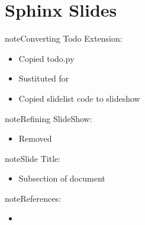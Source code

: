 \documentclass[letterpaper,12pt,english,openany,oneside]{sphinxmanual}
\begin{document}
\sphinxstepscope


\chapter{Sphinx Slides}
\label{\detokenize{slides/index:sphinx-slides}}\label{\detokenize{slides/index::doc}}
\begin{sphinxadmonition}{note}{\label{\detokenize{slides/index:id1}}Converting Todo Extension:}\begin{itemize}
\item {} 
\sphinxAtStartPar
Copied todo.py

\item {} 
\sphinxAtStartPar
Sustituted  for 

\item {} 
\sphinxAtStartPar
Copied slidelist code to slideshow

\end{itemize}
\end{sphinxadmonition}

\begin{sphinxadmonition}{note}{\label{\detokenize{slides/index:id2}}Refining SlideShow:}\begin{itemize}
\item {} 
\sphinxAtStartPar
Removed 

\end{itemize}
\end{sphinxadmonition}

\begin{sphinxadmonition}{note}{\label{\detokenize{slides/index:id3}}Slide Title:}\begin{itemize}
\item {} 
\sphinxAtStartPar
Subsection of document

\end{itemize}
\end{sphinxadmonition}

\begin{sphinxadmonition}{note}{\label{\detokenize{slides/index:id4}}References:}\begin{itemize}
\item {} 
\sphinxAtStartPar
{}

\end{itemize}
\end{sphinxadmonition}
\end{document}
